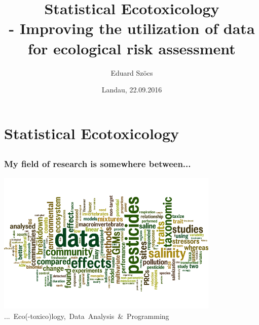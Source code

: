 \documentclass[12pt
, t
]{beamer}
\title{Statistical Ecotoxicology \\ - Improving the utilization of data for ecological risk assessment}
\author{Eduard Szöcs}
\institute{Institute for Environmental Sciences, University of Koblenz-Landau}
\date{Landau, 22.09.2016}
\begin{document}
\begin{frame}
\titlepage
\end{frame}


\section{Statistical Ecotoxicology} 
\subsection{}
\begin{frame}
\frametitle{My field of research is somewhere between...}
\center
\includegraphics[width = 0.8\textwidth]{fig/wc_all.png} \\
\mbox{... Eco(-toxico)logy, Data Analysis \& Programming}
\end{frame}


\subsection{}
\begin{frame}[plain]
\end{frame}
\end{document}

